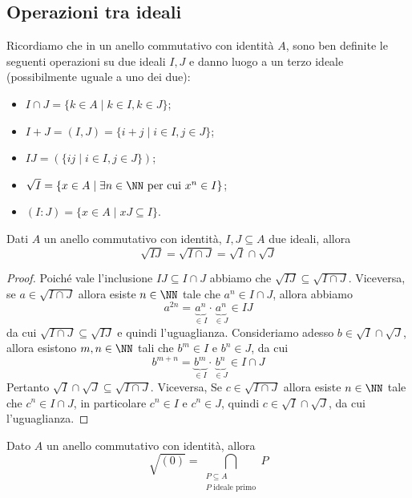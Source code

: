 \documentclass[11pt]{scrartcl}
\begin{document}
	\newpage
	
	\subsection{Operazioni tra ideali}
	
	Ricordiamo che in un anello commutativo con identità $A$, sono ben definite
	le seguenti operazioni su due ideali $I, J$ e danno luogo a un terzo ideale
	(possibilmente uguale a uno dei due):
	\begin{itemize}
		\item $I\cap J = \{k \in A \mid k \in I, k \in J\}$;
		\item $I + J = (I, J) = \{i + j \mid i \in I, j \in J\}$;
		\item $IJ = (\{ij\mid i \in I, j \in J\})$;
		\item $\sqrt{I} = \{x \in A \mid \exists n \in \NN \text{ per cui } x^n \in I\}$;
		\item $(I : J) = \{x \in A \mid xJ \subseteq I\}$.
	\end{itemize}
	
	\begin{proposition}
		Dati $A$ un anello commutativo con identità, $I, J \subseteq A$ due ideali,
		allora
		\[
		\sqrt{IJ} = \sqrt{I\cap J} = \sqrt{I}\cap \sqrt{J}
		\]
	\end{proposition}
	
	\begin{proof}
		Poiché vale l'inclusione $IJ \subseteq I\cap J$ abbiamo che $\sqrt{IJ}
		\subseteq \sqrt{I\cap J}$. Viceversa, se $a \in \sqrt{I\cap J}$ allora
		esiste $n \in \NN$ tale che $a^n \in I\cap J$, allora abbiamo 
		\[
		a^{2n} = \underset{\in I}{\underbrace{a^n}} \cdot \underset{\in J}{\underbrace{a^n}}
		\in IJ
		\]
		da cui $\sqrt{I\cap J} \subseteq \sqrt{IJ}$ e quindi l'uguaglianza.\newline
		Consideriamo adesso $b \in \sqrt{I}\cap \sqrt{J}$, allora esistono $m, n \in \NN$
		tali che $b^m \in I$ e $b^n \in J$, da cui
		\[
		b^{m + n} = \underset{\in I}{\underbrace{b^m}}\cdot
		\underset{\in J}{\underbrace{b^n}} \in I\cap J
		\]
		Pertanto $\sqrt{I}\cap \sqrt{J} \subseteq \sqrt{I\cap J}$. Viceversa, Se
		$c \in \sqrt{I\cap J}$ allora esiste $n \in \NN$ tale che $c^n \in I\cap J$, 
		in particolare $c^n \in I$ e $c^n \in J$, quindi $c \in \sqrt{I}\cap\sqrt{J}$,
		da cui l'uguaglianza.
	\end{proof}
	
	\begin{proposition}
		\label{prop2.9}
		Dato $A$ un anello commutativo con identità, allora
		\[
		\sqrt{(0)} = \bigcap_{\substack{P\subseteq A\\ P \text{ ideale primo}}}P
		\]
	\end{proposition}
	
\end{document}
